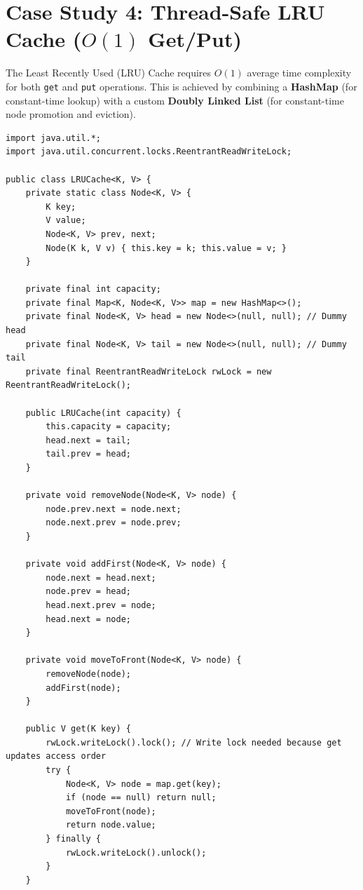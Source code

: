 \documentclass[10pt,journal,compsoc,onecolumn]{IEEEtran}
\begin{document}
\section{Case Study 4: Thread-Safe LRU Cache ($O(1)$ Get/Put)}
\label{sec:lru_cache}

The Least Recently Used (LRU) Cache requires $O(1)$ average time complexity for both \texttt{get} and \texttt{put} operations. This is achieved by combining a \textbf{HashMap} (for constant-time lookup) with a custom \textbf{Doubly Linked List} (for constant-time node promotion and eviction).

\begin{verbatim}
import java.util.*;
import java.util.concurrent.locks.ReentrantReadWriteLock;

public class LRUCache<K, V> {
    private static class Node<K, V> {
        K key;
        V value;
        Node<K, V> prev, next;
        Node(K k, V v) { this.key = k; this.value = v; }
    }

    private final int capacity;
    private final Map<K, Node<K, V>> map = new HashMap<>();
    private final Node<K, V> head = new Node<>(null, null); // Dummy head
    private final Node<K, V> tail = new Node<>(null, null); // Dummy tail
    private final ReentrantReadWriteLock rwLock = new ReentrantReadWriteLock();

    public LRUCache(int capacity) {
        this.capacity = capacity;
        head.next = tail;
        tail.prev = head;
    }

    private void removeNode(Node<K, V> node) {
        node.prev.next = node.next;
        node.next.prev = node.prev;
    }

    private void addFirst(Node<K, V> node) {
        node.next = head.next;
        node.prev = head;
        head.next.prev = node;
        head.next = node;
    }

    private void moveToFront(Node<K, V> node) {
        removeNode(node);
        addFirst(node);
    }

    public V get(K key) {
        rwLock.writeLock().lock(); // Write lock needed because get updates access order
        try {
            Node<K, V> node = map.get(key);
            if (node == null) return null;
            moveToFront(node);
            return node.value;
        } finally {
            rwLock.writeLock().unlock();
        }
    }


\end{verbatim}
\end{document}
